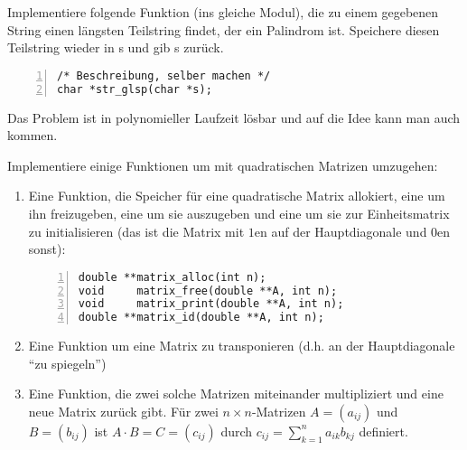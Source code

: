 \documentclass{uebungszettel}
\begin{document}
\begin{aufg}
Implementiere folgende Funktion (ins gleiche Modul), die zu einem gegebenen String einen längsten Teilstring findet, der ein Palindrom ist. Speichere diesen Teilstring wieder in s und gib s zurück.
\begin{codelisting}
\begin{lstlisting}[numbers=left,numberstyle=\tiny,frame=tlrb]
/* Beschreibung, selber machen */
char *str_glsp(char *s);
\end{lstlisting}
\end{codelisting}
Das Problem ist in polynomieller Laufzeit lösbar und auf die Idee kann man auch kommen. 
\end{aufg}
\begin{aufg} Implementiere einige Funktionen um mit quadratischen Matrizen umzugehen:
\begin{enumerate}
\item Eine Funktion, die Speicher für eine quadratische Matrix allokiert, eine um ihn freizugeben, eine um sie auszugeben und eine um sie zur Einheitsmatrix zu initialisieren (das ist die Matrix mit $1$en auf der Hauptdiagonale und $0$en sonst):
\begin{codelisting}
\begin{lstlisting}[numbers=left,numberstyle=\tiny,frame=tlrb]
double **matrix_alloc(int n);
void     matrix_free(double **A, int n);
void     matrix_print(double **A, int n);
double **matrix_id(double **A, int n);
\end{lstlisting}
\end{codelisting}
\item Eine Funktion um eine Matrix zu transponieren (d.h. an der Hauptdiagonale ``zu spiegeln'')
\item Eine Funktion, die zwei solche Matrizen miteinander multipliziert und eine neue Matrix zurück gibt. Für zwei $n \times n$-Matrizen $A = (a_{ij})$ und $B = (b_{ij})$ ist $A \cdot B = C = (c_{ij})$ durch $c_{ij} = \sum_{k=1}^n a_{ik} b_{kj}$ definiert.
\end{enumerate}
\end{aufg}
\end{document}
